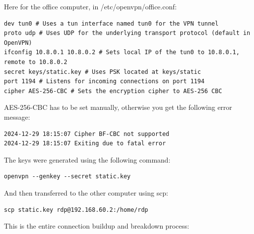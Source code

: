 Here for the office computer, in /etc/openvpn/office.conf:

\begin{verbatim}
dev tun0 # Uses a tun interface named tun0 for the VPN tunnel
proto udp # Uses UDP for the underlying transport protocol (default in OpenVPN)
ifconfig 10.8.0.1 10.8.0.2 # Sets local IP of the tun0 to 10.8.0.1, remote to 10.8.0.2
secret keys/static.key # Uses PSK located at keys/static
port 1194 # Listens for incoming connections on port 1194
cipher AES-256-CBC # Sets the encryption cipher to AES-256 CBC
\end{verbatim}
AES-256-CBC has to be set manually, otherwise you get the following error message:

\begin{verbatim}
2024-12-29 18:15:07 Cipher BF-CBC not supported
2024-12-29 18:15:07 Exiting due to fatal error
\end{verbatim}


The keys were generated using the following command:

\begin{verbatim}
openvpn --genkey --secret static.key
\end{verbatim}

And then transferred to the other computer using scp:

\begin{verbatim}
scp static.key rdp@192.168.60.2:/home/rdp
\end{verbatim}

This is the entire connection buildup and breakdown process:

